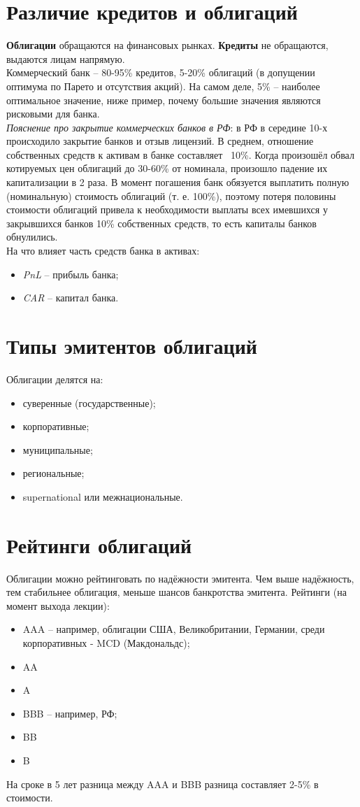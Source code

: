 \documentclass{article}
\begin{document}
\section{Различие кредитов и облигаций}
\textbf{Облигации} обращаются на финансовых рынках. \textbf{Кредиты} не обращаются, выдаются лицам напрямую.\\
Коммерческий банк -- 80-95\% кредитов, 5-20\% облигаций (в допущении оптимума по Парето и отсутствия акций). На самом деле, 5\% -- наиболее оптимальное значение, ниже пример, почему большие значения являются рисковыми для банка.\\
\textit{Пояснение про закрытие коммерческих банков в РФ}: в РФ в середине 10-х происходило закрытие банков и отзыв лицензий. В среднем, отношение собственных средств к активам в банке составляет ~10\%. Когда произошёл обвал котируемых цен облигаций до 30-60\% от номинала, произошло падение их капитализации в 2 раза. В момент погашения банк обязуется выплатить полную (номинальную) стоимость облигаций (т. е. 100\%), поэтому потеря половины стоимости облигаций привела к необходимости выплаты всех имевшихся у закрывшихся банков 10\% собственных средств, то есть капиталы банков обнулились.\\
На что влияет часть средств банка в активах:
\begin{itemize}
    \item \textit{PnL} -- прибыль банка;
    \item \textit{CAR} -- капитал банка.
\end{itemize}
\section{Типы эмитентов облигаций}
Облигации делятся на:
\begin{itemize}
    \item суверенные (государственные);
    \item корпоративные;
    \item муниципальные;
    \item региональные;
    \item supernational или межнациональные.
\end{itemize}
\section{Рейтинги облигаций}
Облигации можно рейтинговать по надёжности эмитента. Чем выше надёжность, тем стабильнее облигация, меньше шансов банкротства эмитента.
Рейтинги (на момент выхода лекции):
\begin{itemize}
    \item AAA -- например, облигации США, Великобритании, Германии, среди корпоративных - MCD (Макдональдс);
    \item AA
    \item A
    \item BBB -- например, РФ;
    \item BB
    \item B
\end{itemize}
На сроке в 5 лет разница между AAA и BBB разница составляет 2-5\% в стоимости.
\end{document}

